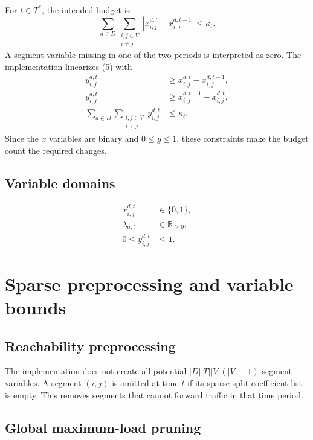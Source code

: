\documentclass[11pt,a4paper]{article}
\newcommand{\R}{\mathbb{R}}
\newcommand{\Tstar}{T^{\ast}}
\begin{document}
For $t\in\Tstar$, the intended budget is
\begin{equation}
\sum_{d\in D}\sum_{\substack{i,j\in V\\i\neq j}}
\left|x_{i,j}^{d,t}-x_{i,j}^{d,t-1}\right|
\leq\kappa_t.
\tag{5}
\end{equation}
A segment variable missing in one of the two periods is interpreted as zero.
The implementation linearizes (5) with
\begin{align}
y_{i,j}^{d,t}&\geq x_{i,j}^{d,t}-x_{i,j}^{d,t-1}, \tag{5a}\\
y_{i,j}^{d,t}&\geq x_{i,j}^{d,t-1}-x_{i,j}^{d,t}, \tag{5b}\\
\sum_{d\in D}\sum_{\substack{i,j\in V\\i\neq j}}y_{i,j}^{d,t}
&\leq\kappa_t. \tag{5c}
\end{align}
Since the $x$ variables are binary and $0\leq y\leq1$, these constraints make
the budget count the required changes.

\subsection{Variable domains}

\begin{align}
x_{i,j}^{d,t}&\in\{0,1\}, \tag{6a}\\
\lambda_{a,t}&\in\R_{\geq0}, \tag{6b}\\
0\leq y_{i,j}^{d,t}&\leq1. \tag{6c}
\end{align}

\section{Sparse preprocessing and variable bounds}

\subsection{Reachability preprocessing}

The implementation does not create all potential $|D||T||V|(|V|-1)$ segment
variables. A segment $(i,j)$ is omitted at time $t$ if its sparse split-coefficient
list is empty. This removes segments that cannot forward traffic in that time
period.

\subsection{Global maximum-load pruning}
\end{document}
